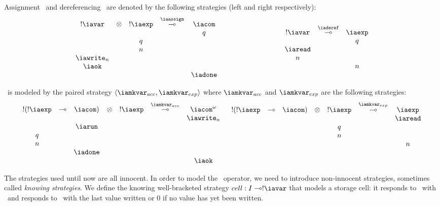 Assignment \iaassign\ and dereferencing \iaderef\ are denoted  by the
following strategies (left and right respectively):
$$
\begin{array}{ccccc}
!\iavar & \otimes & ! \iaexp & \stackrel{\iaassign}{\multimap} & \iacom\\
&&&&q\\
&&q\\
&&n\\
\iawrite_n\\
\iaok\\
&&&&\iadone
\end{array}
\hspace{3cm}
\begin{array}{ccccc}
!\iavar & \stackrel{\iaderef}{\multimap} & \iaexp\\
&&q\\
\iaread\\
n\\
&&n
\end{array}
$$

\iamkvar\ is modeled by the paired strategy $\langle \iamkvar_{acc} , \iamkvar_{exp}
\rangle$ where $\iamkvar_{acc}$ and $\iamkvar_{exp}$ are the following strategies:
$$
\begin{array}{ccccccc}
!(!\iaexp & \multimap & \iacom) & \otimes & !\iaexp & \stackrel{\iamkvar_{acc}}{\multimap} & \iacom^\omega\\
&&&&&&\iawrite_n\\
&&\iarun\\
q\\
n\\
&&\iadone \\
&&&&&&\iaok
\end{array}
\hspace{0.2cm}
\begin{array}{ccccccc}
!(!\iaexp & \multimap & \iacom) & \otimes & !\iaexp & \stackrel{\iamkvar_{exp}}{\multimap} & \iaexp\\
&&&&&&\iaread\\
&&&&q\\
&&&&n\\
&&&&&&n \\ \  \\ \
\end{array}
$$


The strategies used until now are all innocent. In order to model
the \ianew\ operator, we need to introduce non-innocent strategies,
sometimes called \emph{knowing strategies}. We define the knowing
well-bracketed strategy $cell : I \multimap !\iavar$ that models a
storage cell: it responds to \iawrite\ with \iaok\ and responds to
\iaread\ with the last value written or $0$ if no value has yet been
written.

